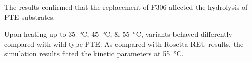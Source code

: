 \begin{refsection}
The results confirmed that the replacement of F306 affected the hydrolysis of
PTE substrates. 

Upon heating up to \SIlist{35;45;55}{\celsius}, variants behaved differently
compared with wild-type PTE. As compared with Rosetta REU results, the
simulation results fitted the kinetic parameters at \SI{55}{\celsius}. 

\printbibliography[heading=subbibliography]

\end{refsection}
